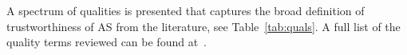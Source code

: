 







A spectrum of qualities is presented that captures the broad definition of trustworthiness of AS from the literature, see Table~\ref{tab:quals}. A full list of the quality terms reviewed can be found at~\cite{tsl_git}.

